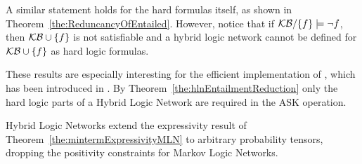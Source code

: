 A similar statement holds for the hard formulas itself, as shown in Theorem~\ref{the:ReduncancyOfEntailed}.
However, notice that if $\mathcal{KB}/\{f\}\models\lnot f$, then $\mathcal{KB}\cup\{f\}$ is not satisfiable and a hybrid logic network cannot be defined for $\mathcal{KB}\cup\{f\}$ as hard logic formulas.


These results are especially interesting for the efficient implementation of , which has been introduced in .
By Theorem~\ref{the:hlnEntailmentReduction} only the hard logic parts of a Hybrid Logic Network are required in the ASK operation.


Hybrid Logic Networks extend the expressivity result of Theorem~\ref{the:mintermExpressivityMLN} to arbitrary probability tensors, dropping the positivity constraints for Markov Logic Networks.

